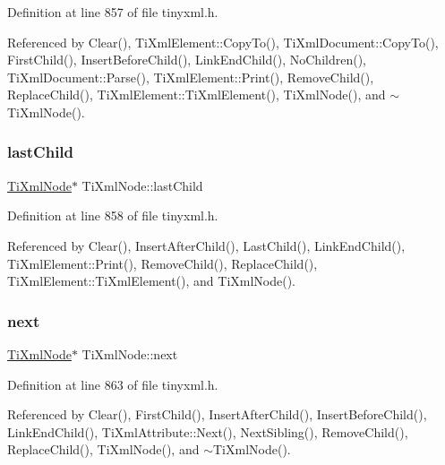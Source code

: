 Definition at line 857 of file tinyxml.\+h.



Referenced by Clear(), Ti\+Xml\+Element\+::\+Copy\+To(), Ti\+Xml\+Document\+::\+Copy\+To(), First\+Child(), Insert\+Before\+Child(), Link\+End\+Child(), No\+Children(), Ti\+Xml\+Document\+::\+Parse(), Ti\+Xml\+Element\+::\+Print(), Remove\+Child(), Replace\+Child(), Ti\+Xml\+Element\+::\+Ti\+Xml\+Element(), Ti\+Xml\+Node(), and $\sim$\+Ti\+Xml\+Node().

\hypertarget{class_ti_xml_node_a5b30756d21b304580d22a841ec9d61f8}{}\label{class_ti_xml_node_a5b30756d21b304580d22a841ec9d61f8} 
\subsubsection{\texorpdfstring{last\+Child}{lastChild}}
{\footnotesize\ttfamily \hyperlink{class_ti_xml_node}{Ti\+Xml\+Node}$\ast$ Ti\+Xml\+Node\+::last\+Child\hspace{0.3cm}{\ttfamily [protected]}}



Definition at line 858 of file tinyxml.\+h.



Referenced by Clear(), Insert\+After\+Child(), Last\+Child(), Link\+End\+Child(), Ti\+Xml\+Element\+::\+Print(), Remove\+Child(), Replace\+Child(), Ti\+Xml\+Element\+::\+Ti\+Xml\+Element(), and Ti\+Xml\+Node().

\hypertarget{class_ti_xml_node_a2f329cc993d2d34df76e17dcbb776b45}{}\label{class_ti_xml_node_a2f329cc993d2d34df76e17dcbb776b45} 
\subsubsection{\texorpdfstring{next}{next}}
{\footnotesize\ttfamily \hyperlink{class_ti_xml_node}{Ti\+Xml\+Node}$\ast$ Ti\+Xml\+Node\+::next\hspace{0.3cm}{\ttfamily [protected]}}



Definition at line 863 of file tinyxml.\+h.



Referenced by Clear(), First\+Child(), Insert\+After\+Child(), Insert\+Before\+Child(), Link\+End\+Child(), Ti\+Xml\+Attribute\+::\+Next(), Next\+Sibling(), Remove\+Child(), Replace\+Child(), Ti\+Xml\+Node(), and $\sim$\+Ti\+Xml\+Node().

